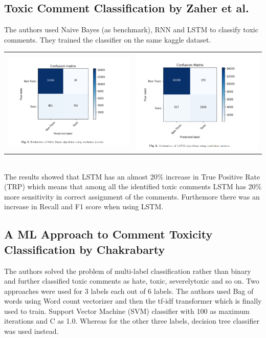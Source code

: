 \documentclass[11pt]{article}
\begin{document}
\subsection{Toxic Comment Classification by Zaher et al.}
The authors used Naive Bayes (as benchmark), RNN and LSTM to classify toxic comments. They trained the classifier on the same kaggle dataset. 
	\\
	\begin{tabular}{cc}
		\includegraphics[width=65mm]{figs/zaher_bayes.png} & \includegraphics[width=65mm]{figs/zaher_lstm.png} 
	\end{tabular} \\
The results showed that LSTM has an almost 20\% increase in True Positive Rate (TRP) which means that among all the identified toxic comments
LSTM has 20\% more sensitivity in correct assignment of the comments. Furthemore there was an increase in Recall and F1 score when using LSTM.

\subsection{A ML Approach to Comment Toxicity Classification by Chakrabarty}
The authors solved the problem of multi-label 
classification rather than binary and further classified toxic comments as hate, toxic, severelytoxic and so on. 
Two approaches were used for 3 labels each out of 6 labels. 
The authors used Bag of words using Word count vectorizer and then the tf-idf transformer which is finally used to train. Support Vector Machine (SVM) classifier with 100 as maximum iterations and C as 1.0. Whereas for the other three labels, decision tree classifier was used instead.
\end{document}

